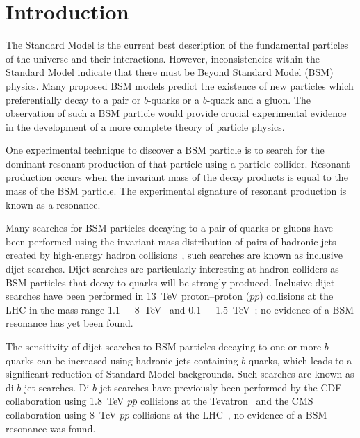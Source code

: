 \chapter{Introduction}
\label{sec:int}
The Standard Model is the current best description of the fundamental particles of the universe and their interactions.
However, inconsistencies within the Standard Model indicate that
there must be Beyond Standard Model (BSM) physics.
Many proposed BSM models predict the existence of new particles
which preferentially decay to a pair or $b$-quarks or a $b$-quark and a gluon.
The observation of such a BSM particle would provide crucial experimental
evidence in the development of a more complete theory of particle physics.


One experimental technique to discover a BSM particle is to search for
the dominant resonant production of that particle using a particle collider.
Resonant production occurs when the invariant mass of the decay products is equal to the mass of the BSM particle.
The experimental signature of resonant production is known as a resonance.

Many searches for BSM particles decaying to a pair of quarks or gluons
have been performed using the invariant mass distribution of pairs of hadronic jets created
by high-energy hadron collisions~\cite{theo-dijet_harris}, such searches are known as inclusive dijet searches.
Dijet searches are particularly interesting at hadron colliders as BSM particles
that decay to quarks will be strongly produced.
Inclusive dijet searches have been performed in 13~TeV proton--proton ($pp$) collisions at the LHC
in the mass range 1.1~--~8~TeV~\cite{dijet-mori16_paper,dijet-mori17_paper,dijet-cms}
and 0.1~--~1.5~TeV~\cite{dijet-isr,dijet-TLA,dijet-isr_cms};
no evidence of a BSM resonance has yet been found.

The sensitivity of dijet searches to BSM particles decaying to one or more $b$-quarks can be increased
using hadronic jets containing $b$-quarks,
which leads to a significant reduction of Standard Model backgrounds.
Such searches are known as di-$b$-jet searches.
Di-$b$-jet searches have previously been performed by
the CDF collaboration using 1.8~TeV $p\bar{p}$ collisions at the Tevatron~\cite{dibjet-cdf}
and the CMS collaboration using 8~TeV $pp$ collisions at the LHC~\cite{dibjet-cms},
no evidence of a BSM resonance was found.

